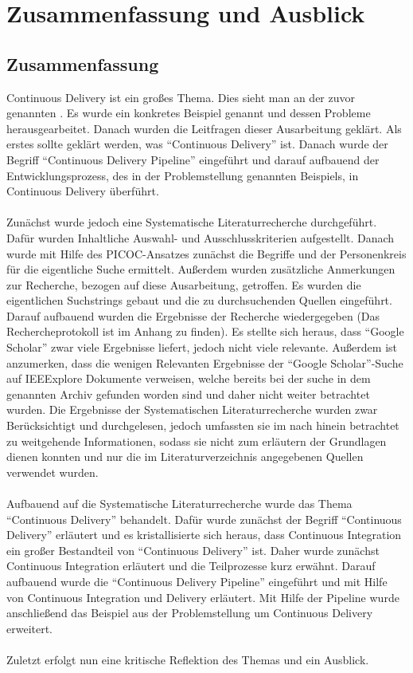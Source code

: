 \chapter{Zusammenfassung und Ausblick}
\label{chap:zusammenfassungUndAusblick}

\section{Zusammenfassung}
\label{sec:zusammenfassung}
Continuous Delivery ist ein großes Thema. Dies sieht man an der zuvor genannten . Es wurde ein konkretes Beispiel genannt und dessen Probleme herausgearbeitet. Danach wurden die Leitfragen dieser Ausarbeitung geklärt. Als erstes sollte geklärt werden, was "`Continuous Delivery"' ist. Danach wurde der Begriff "`Continuous Delivery Pipeline"' eingeführt und darauf aufbauend der Entwicklungsprozess, des in der Problemstellung genannten Beispiels, in Continuous Delivery überführt.
\\\\
Zunächst wurde jedoch eine Systematische Literaturrecherche durchgeführt. Dafür wurden Inhaltliche Auswahl- und Ausschlusskriterien aufgestellt. Danach wurde mit Hilfe des PICOC-Ansatzes zunächst die Begriffe und der Personenkreis für die eigentliche Suche ermittelt. Außerdem wurden zusätzliche Anmerkungen zur Recherche, bezogen auf diese Ausarbeitung,  getroffen. Es wurden die eigentlichen Suchstrings gebaut und die zu durchsuchenden Quellen eingeführt. Darauf aufbauend wurden die Ergebnisse der Recherche wiedergegeben (Das Rechercheprotokoll ist im Anhang zu finden). Es stellte sich heraus, dass "`Google Scholar"' zwar viele Ergebnisse liefert, jedoch nicht viele relevante. Außerdem ist anzumerken, dass die wenigen Relevanten Ergebnisse der "`Google Scholar"'-Suche auf IEEExplore Dokumente verweisen, welche bereits bei der suche in dem genannten Archiv gefunden worden sind und daher nicht weiter betrachtet wurden. Die Ergebnisse der Systematischen Literaturrecherche wurden zwar Berücksichtigt und durchgelesen, jedoch umfassten sie im nach hinein betrachtet zu weitgehende Informationen, sodass sie nicht zum erläutern der Grundlagen dienen konnten und nur die im Literaturverzeichnis angegebenen Quellen verwendet wurden.
\\\\
Aufbauend auf die Systematische Literaturrecherche wurde das Thema "`Continuous Delivery"' behandelt. Dafür wurde zunächst der Begriff "`Continuous Delivery"' erläutert und es kristallisierte sich heraus, dass Continuous Integration ein großer Bestandteil von "`Continuous Delivery"' ist. Daher wurde zunächst Continuous Integration erläutert und die Teilprozesse kurz erwähnt. Darauf aufbauend wurde die "`Continuous Delivery Pipeline"' eingeführt und mit Hilfe von Continuous Integration und Delivery erläutert. Mit Hilfe der Pipeline wurde anschließend das Beispiel aus der Problemstellung um Continuous Delivery erweitert.
\\\\
Zuletzt erfolgt nun eine kritische Reflektion des Themas und ein Ausblick.

